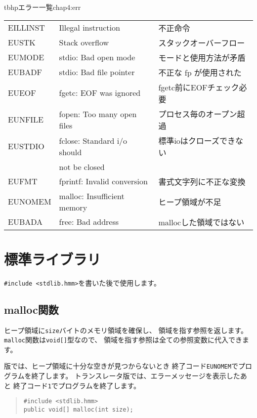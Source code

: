 \begin{mytable}{tbhp}{エラー一覧}{chap4:err}
\begin{tabular}{l|l|l}
EILLINST  & Illegal instruction         & 不正命令 \\
EUSTK     & Stack overflow              & スタックオーバーフロー \\
EUMODE    & stdio: Bad open mode        & モードと使用方法が矛盾 \\
EUBADF    & stdio: Bad file pointer     & 不正な fp が使用された \\
EUEOF     & fgetc: EOF was ignored      & fgetc前にEOFチェック必要 \\
EUNFILE   & fopen: Too many open files  & プロセス毎のオープン超過 \\
EUSTDIO   & fclose: Standard i/o should & 標準ioはクローズできない \\
          &  not be closed              &                          \\
EUFMT     & fprintf: Invalid conversion & 書式文字列に不正な変換 \\
EUNOMEM   & malloc: Insufficient memory & ヒープ領域が不足 \\
EUBADA    & free: Bad address           & mallocした領域ではない \\
\end{tabular}
\end{mytable}

\section{標準ライブラリ}

\verb/#include <stdlib.hmm>/を書いた後で使用します。

\subsection{malloc関数}

ヒープ領域に\verb/size/バイトのメモリ領域を確保し、
領域を指す参照を返します。
\verb/malloc/関数は\verb/void[]/型なので、
領域を指す参照は全ての参照変数に代入できます。

\tac 版では、ヒープ領域に十分な空きが見つからないとき
終了コード\verb/EUNOMEM/でプログラムを終了します。
トランスレータ版では、エラーメッセージを表示したあと
終了コード\verb/1/でプログラムを終了します。

\begin{quote}
\begin{verbatim}
#include <stdlib.hmm>
public void[] malloc(int size);
\end{verbatim}
\end{quote}

